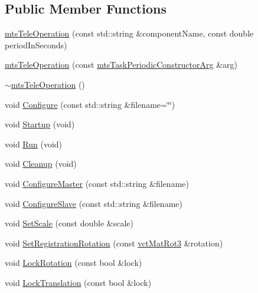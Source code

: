 \subsection*{Public Member Functions}
\begin{DoxyCompactItemize}
\item 
\hyperlink{classmts_tele_operation_a6547280de1e8cdcade16708da2cccc2a}{mts\-Tele\-Operation} (const std\-::string \&component\-Name, const double period\-In\-Seconds)
\item 
\hyperlink{classmts_tele_operation_a4082b5b6eb45a3e05f9bce47e3de99d9}{mts\-Tele\-Operation} (const \hyperlink{classmts_task_periodic_constructor_arg}{mts\-Task\-Periodic\-Constructor\-Arg} \&arg)
\item 
\hyperlink{classmts_tele_operation_aa433b36bc093a7a386fb8c39682b6f19}{$\sim$mts\-Tele\-Operation} ()
\item 
void \hyperlink{classmts_tele_operation_a629c7e4761dc10f23f296b8110fa786f}{Configure} (const std\-::string \&filename=\char`\"{}\char`\"{})
\item 
void \hyperlink{classmts_tele_operation_a1561a15caad99bdcb5560eab8e831da7}{Startup} (void)
\item 
void \hyperlink{classmts_tele_operation_a9d7840b7ac88227c2b49cc83d98bdbb7}{Run} (void)
\item 
void \hyperlink{classmts_tele_operation_aa52d274db632fd939870d8cb0baaa7bf}{Cleanup} (void)
\item 
void \hyperlink{classmts_tele_operation_a32c09a7d07c963c2886abb789e3f875b}{Configure\-Master} (const std\-::string \&filename)
\item 
void \hyperlink{classmts_tele_operation_a918b83728d22310cbe11cbb4489475ec}{Configure\-Slave} (const std\-::string \&filename)
\item 
void \hyperlink{classmts_tele_operation_a9710c30ce3dd3b197028de6a7725bfbb}{Set\-Scale} (const double \&scale)
\item 
void \hyperlink{classmts_tele_operation_af89b5f97f6971f7b81f2bded20851a91}{Set\-Registration\-Rotation} (const \hyperlink{vct_transformation_types_8h_a30fe23c1d38748a9b8f2fb9bb2471382}{vct\-Mat\-Rot3} \&rotation)
\item 
void \hyperlink{classmts_tele_operation_ac09c8dad8560ccaed337acf669c603a6}{Lock\-Rotation} (const bool \&lock)
\item 
void \hyperlink{classmts_tele_operation_a7baf2414839f24d93a966c464867e3e5}{Lock\-Translation} (const bool \&lock)
\end{DoxyCompactItemize}
